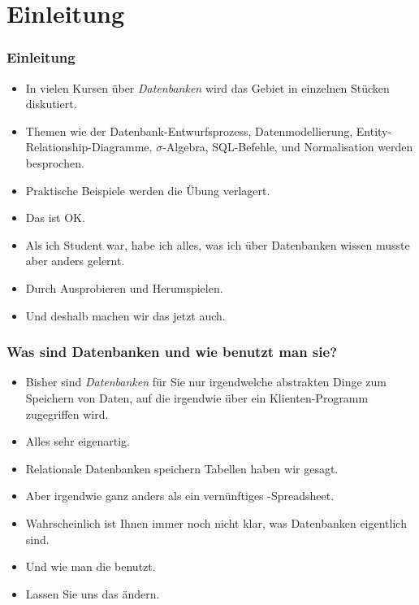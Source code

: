 \documentclass[aspectratio=169,mathserif,notheorems]{beamer}%
\subtitle{7.~Fabrik-Datenbank~(Teil 1)}%
\begin{document}
%
%
\startPresentation%
%
\section{Einleitung}%
%
\begin{frame}%
\frametitle{Einleitung}%
\begin{itemize}%
\item In vielen Kursen über \emph{Datenbanken} wird das Gebiet in einzelnen Stücken diskutiert.%
\item<2-> Themen wie der Datenbank-Entwurfsprozess, Datenmodellierung, Entity-Relationship-Diagramme, $\sigma$\nobreakdashes-Algebra, SQL\nobreakdashes-Befehle, und Normalisation werden besprochen.%
\item<3-> Praktische Beispiele werden die Übung verlagert.%
\item<4-> Das ist OK.%
\item<5-> Als ich Student war, habe ich alles, was ich über Datenbanken wissen musste aber anders gelernt.%
\item<6-> Durch Ausprobieren und Herumspielen.%
\item<7-> Und deshalb machen wir das jetzt auch.%
\end{itemize}%
\end{frame}%
%
\begin{frame}%
\frametitle{Was sind Datenbanken und wie benutzt man sie?}%
\begin{itemize}%
\item Bisher sind \emph{Datenbanken} für Sie nur irgendwelche abstrakten Dinge zum Speichern von Daten, auf die irgendwie über ein Klienten-Programm zugegriffen wird.%
\item<2-> Alles sehr eigenartig.%
\item<3-> Relationale Datenbanken speichern Tabellen haben wir gesagt.%
\item<4-> Aber irgendwie ganz anders als ein vernünftiges \microsoftExcel-Spreadsheet.%
\item<5-> Wahrscheinlich ist Ihnen immer noch nicht klar, was Datenbanken eigentlich sind.%
\item<6-> Und wie man die benutzt.%
\item<7-> Lassen Sie uns das ändern.%
\end{itemize}%
\end{frame}%
%
\end{document}
